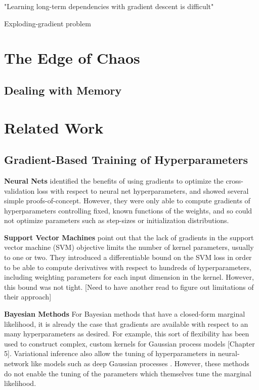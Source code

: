 \documentclass{article}
\begin{document}
"Learning long-term dependencies with gradient descent is difficult" \cite{bengio1994learning}

Exploding-gradient problem \cite{pascanu2012understanding}

\section{The Edge of Chaos}

\subsection{Dealing with Memory}


\section{Related Work}

\subsection{Gradient-Based Training of Hyperparameters}
{\textbf{Neural Nets}}
\cite{bengio2000gradient, larsen1998adaptive} identified the benefits of using gradients to optimize the cross-validation loss with respect to neural net hyperparameters, and showed several simple proofs-of-concept.
However, they were only able to compute gradients of hyperparameters controlling fixed, known functions of the weights, and so could not optimize parameters such as step-sizes or initialization distributions.

{\textbf{Support Vector Machines}}
\cite{chapelle2002choosing} point out that the lack of gradients in the support vector machine (SVM) objective limits the number of kernel parameters, usually to one or two.
They introduced a differentiable bound on the SVM loss in order to be able to compute derivatives with respect to hundreds of hyperparameters, including weighting parameters for each input dimension in the kernel.
However, this bound was not tight. [Need to have another read to figure out limitations of their approach]

{\textbf{Bayesian Methods}}
For Bayesian methods that have a closed-form marginal likelihood, it is already the case that gradients are available with respect to an many hyperparameters as desired.
For example, this sort of flexibility has been used to construct complex, custom kernels for Gaussian process models \cite{rasmussen38gaussian}[Chapter 5].
Variational inference also allow the tuning of hyperparameters in neural-network like models such as deep Gaussian processes \citep{deepGPVar14}.
However, these methods do not enable the tuning of the parameters which themselves tune the marginal likelihood.
\end{document}
